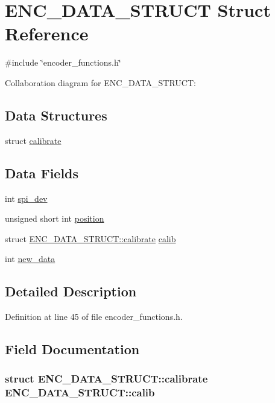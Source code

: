 \hypertarget{structENC__DATA__STRUCT}{
\section{ENC\_\-DATA\_\-STRUCT Struct Reference}
\label{structENC__DATA__STRUCT}
}


{\ttfamily \#include \char`\"{}encoder\_\-functions.h\char`\"{}}



Collaboration diagram for ENC\_\-DATA\_\-STRUCT:\subsection*{Data Structures}
\begin{DoxyCompactItemize}
\item 
struct \hyperlink{structENC__DATA__STRUCT_1_1calibrate}{calibrate}
\end{DoxyCompactItemize}
\subsection*{Data Fields}
\begin{DoxyCompactItemize}
\item 
int \hyperlink{structENC__DATA__STRUCT_a93b8e925392a12a8874bf59f2a1cd76a}{spi\_\-dev}
\item 
unsigned short int \hyperlink{structENC__DATA__STRUCT_ac3a53ed44ecaf87285518a091e1d2c24}{position}
\item 
struct \hyperlink{structENC__DATA__STRUCT_1_1calibrate}{ENC\_\-DATA\_\-STRUCT::calibrate} \hyperlink{structENC__DATA__STRUCT_af227e5bbb714b830cc570432bda0a468}{calib}
\item 
int \hyperlink{structENC__DATA__STRUCT_adbfb6e5764f0e3c42f4e212deb5d1f21}{new\_\-data}
\end{DoxyCompactItemize}


\subsection{Detailed Description}


Definition at line 45 of file encoder\_\-functions.h.



\subsection{Field Documentation}
\hypertarget{structENC__DATA__STRUCT_af227e5bbb714b830cc570432bda0a468}{
\subsubsection[{calib}]{\setlength{\rightskip}{0pt plus 5cm}struct {\bf ENC\_\-DATA\_\-STRUCT::calibrate} {\bf ENC\_\-DATA\_\-STRUCT::calib}}}
\label{structENC__DATA__STRUCT_af227e5bbb714b830cc570432bda0a468}



